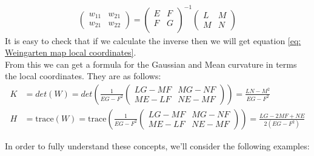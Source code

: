 \documentclass{article}
\theoremstyle{plain}
\theoremstyle{definition}
\theoremstyle{remark}
\begin{document}
\begin{align*}
    \begin{pmatrix}
        w_{11} & w_{21} \\
        w_{21} & w_{22} 
    \end{pmatrix} = 
    \begin{pmatrix}
        E & F \\
        F & G \\
    \end{pmatrix}^{-1}
    \begin{pmatrix}
        L & M \\
        M & N 
    \end{pmatrix}
\end{align*}
It is easy to check that if we calculate the inverse then we will get equation \ref{eq: Weingarten map local coordinates}. \\

From this we can get a formula for the Gaussian and Mean curvature in terms the local coordinates. They are as follows:
\begin{align*}
    K & = det(W) = det\left( \frac{1}{EG-F^2} \begin{pmatrix}
        LG - MF & MG - NF \\
        ME - LF & NE- MF
    \end{pmatrix} \right) = \frac{LN-M^2}{EG-F^2} \\
    H & = \text{trace}(W) = \text{trace}\left(\frac{1}{EG-F^2} \begin{pmatrix}
        LG - MF & MG - NF \\
        ME - LF & NE- MF
    \end{pmatrix} \right) = \frac{LG-2MF+NE}{2(EG-F^2)}
\end{align*}

In order to fully understand these concepts, we'll consider the following examples:
\end{document}
